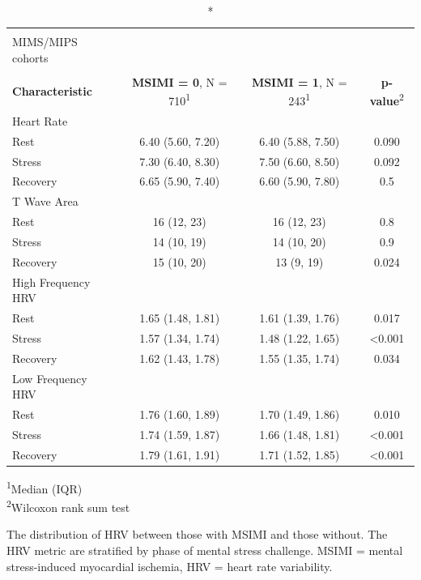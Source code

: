 \documentclass[
  11pt,
  openany]{book}
\begin{document}
\captionsetup[table]{labelformat=empty,skip=1pt}
\begin{longtable}{lccc}
\caption*{
\large HRV distribution by MSIMI\\ 
\small MIMS/MIPS cohorts\\ 
} \\ 
\toprule
\textbf{Characteristic} & \textbf{MSIMI = 0}, N = 710\textsuperscript{1} & \textbf{MSIMI = 1}, N = 243\textsuperscript{1} & \textbf{p-value}\textsuperscript{2} \\ 
\midrule
\multicolumn{1}{l}{Heart Rate} \\ 
\midrule
Rest & 6.40 (5.60, 7.20) & 6.40 (5.88, 7.50) & 0.090 \\ 
Stress & 7.30 (6.40, 8.30) & 7.50 (6.60, 8.50) & 0.092 \\ 
Recovery & 6.65 (5.90, 7.40) & 6.60 (5.90, 7.80) & 0.5 \\ 
\midrule
\multicolumn{1}{l}{T Wave Area} \\ 
\midrule
Rest & 16 (12, 23) & 16 (12, 23) & 0.8 \\ 
Stress & 14 (10, 19) & 14 (10, 20) & 0.9 \\ 
Recovery & 15 (10, 20) & 13 (9, 19) & 0.024 \\ 
\midrule
\multicolumn{1}{l}{High Frequency HRV} \\ 
\midrule
Rest & 1.65 (1.48, 1.81) & 1.61 (1.39, 1.76) & 0.017 \\ 
Stress & 1.57 (1.34, 1.74) & 1.48 (1.22, 1.65) & <0.001 \\ 
Recovery & 1.62 (1.43, 1.78) & 1.55 (1.35, 1.74) & 0.034 \\ 
\midrule
\multicolumn{1}{l}{Low Frequency HRV} \\ 
\midrule
Rest & 1.76 (1.60, 1.89) & 1.70 (1.49, 1.86) & 0.010 \\ 
Stress & 1.74 (1.59, 1.87) & 1.66 (1.48, 1.81) & <0.001 \\ 
Recovery & 1.79 (1.61, 1.91) & 1.71 (1.52, 1.85) & <0.001 \\ 
\bottomrule
\end{longtable}
\vspace{-5mm}
\begin{minipage}{\linewidth}
\textsuperscript{1}Median (IQR) \\ 
\textsuperscript{2}Wilcoxon rank sum test \\ 
\end{minipage}
\begin{minipage}{\linewidth}
The distribution of HRV between those with MSIMI and those without. The HRV metric are stratified by phase of mental stress challenge. MSIMI = mental stress-induced myocardial ischemia, HRV = heart rate variability.\\ 
\end{minipage}
\end{document}
